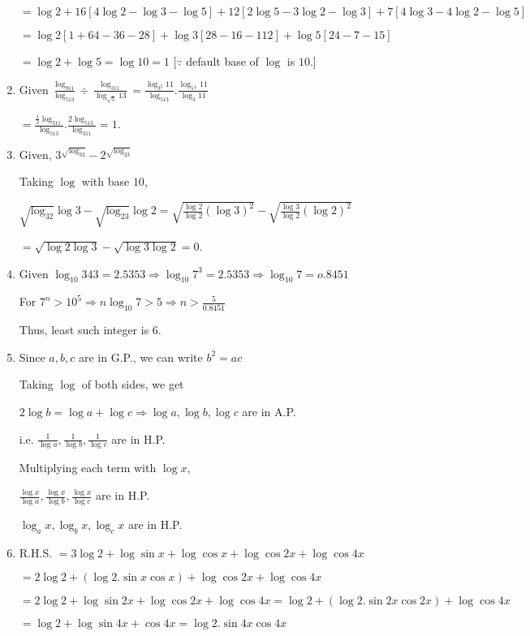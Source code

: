 \begin{enumerate}
  $= \log 2 + 16[4\log 2 - \log 3 - \log 5] + 12[2\log 5 - 3\log 2 - \log 3] + 7[4\log 3 - 4\log 2 - \log 5]$

  $= \log 2[1 + 64 - 36 - 28] + \log 3[28 - 16 -1 12] + \log 5[24 - 7 - 15]$

  $= \log 2 + \log 5 = \log 10 = 1$ [$\because$ default base of $\log$ is $10$.]
\item Given $\frac{\log_911}{\log_513}\div\frac{\log_311}{\log_{\sqrt{5}}13} =
  \frac{\log_{3^2}11}{\log_513}.\frac{\log_{5^{\tfrac{1}{2}}}11}{\log_3 11}$

  $= \frac{\tfrac{1}{2}\log_311}{\log_513}.\frac{2\log_513}{\log_311} = 1$.
\item Given, $3^{\sqrt{\log_32}} - 2^{\sqrt{\log_23}}$

  Taking $\log$ with base $10$,

  $\sqrt{\log_32}\log 3 - \sqrt{\log_23}\log 2 = \sqrt{\frac{\log 2}{\log 2}(\log 3)^2} - \sqrt{\frac{\log 3}{\log 2}(\log 2)^2}$

  $= \sqrt{\log 2\log 3} - \sqrt{\log 3\log 2} = 0$.
\item Given $\log_{10}343 = 2.5353 \Rightarrow \log_{10}7^3 = 2.5353 \Rightarrow \log_{10}7 = o.8451$

  For $7^n > 10^5 \Rightarrow n\log_{10}7 > 5 \Rightarrow n > \frac{5}{0.8451}$

  Thus, least such integer is $6$.
\item Since $a, b, c$ are in G.P., we can write $b^2 = ac$

  Taking $\log$ of both sides, we get

  $2\log b = \log a + \log c \Rightarrow \log a, \log b, \log c$ are in A.P.

  i.e. $\frac{1}{\log a}, \frac{1}{\log b}, \frac{1}{\log c}$ are in H.P.

  Multiplying each term with $\log x$,

  $\frac{\log x}{\log a}, \frac{\log x}{\log b}, \frac{\log x}{\log c}$ are in H.P.

  $\log_ax, \log_bx, \log_cx$ are in H.P.
\item R.H.S. $= 3\log2 + \log\sin x + \log\cos x + \log\cos2x + \log\cos4x$

  $= 2\log 2 + (\log 2.\sin x\cos x) + \log\cos2x + \log\cos4x$

  $= 2\log 2 + \log\sin2x + \log\cos2x + \log\cos4x = \log 2 + (\log 2.\sin2x\cos2x) + \log\cos4x$

  $= \log 2 + \log\sin4x + \cos4x = \log 2.\sin4x\cos4x$


\end{enumerate}
